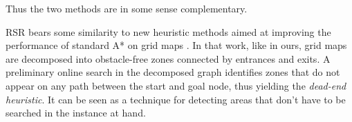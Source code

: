 Thus the two methods are in some sense complementary.
\par
RSR bears some similarity to new heuristic methods aimed at improving the 
performance of standard A* on grid maps \cite{bjornsson06}.
In that work, like in ours, grid maps are decomposed into obstacle-free zones connected by entrances 
and exits.
A preliminary online search in the decomposed graph identifies zones that do not appear 
on any path between the start and goal node, thus yielding the \emph{dead-end heuristic}.
It can be seen as a technique for detecting areas that don't have to be searched
in the instance at hand.


